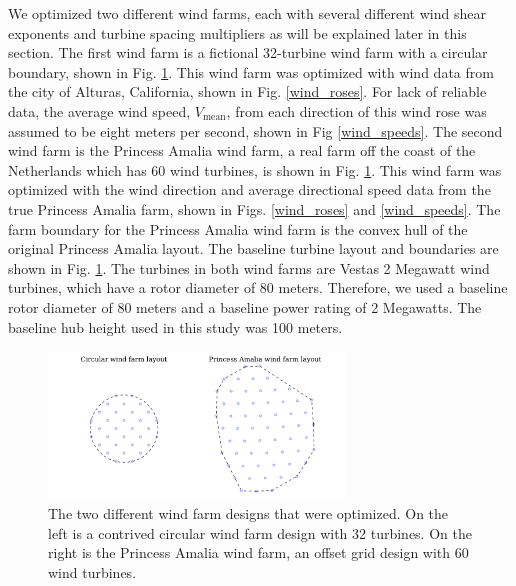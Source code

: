We optimized two different wind farms, each with several different wind shear exponents and turbine spacing multipliers as will be explained later in this section. 
The first wind farm is a fictional 32-turbine wind farm with a circular boundary, shown in Fig. \ref{layouts}. %
This wind farm was optimized with wind data from the city of Alturas, California, shown in Fig. \ref{wind_roses}. For lack of reliable data, the average wind speed, $V_{\text{mean}}$, from each direction of this wind rose was assumed to be eight meters per second, shown in Fig \ref{wind_speeds}.
The second wind farm is the Princess Amalia wind farm, a real farm off the coast of the Netherlands which has 60 wind turbines, is shown in Fig. \ref{layouts}. This wind farm was optimized with the wind direction and average directional speed data from the true Princess Amalia farm, shown in Figs. \ref{wind_roses} and \ref{wind_speeds}. The farm boundary for the Princess Amalia wind farm is the convex hull of the original Princess Amalia layout. The baseline turbine layout and boundaries are shown in Fig. \ref{layouts}. The turbines in both wind farms are Vestas 2 Megawatt wind turbines, which have a rotor diameter of 80 meters. Therefore, we used a baseline rotor diameter of 80 meters and a baseline power rating of 2 Megawatts. The baseline hub height used in this study was 100 meters. 

\begin{figure}[htbp]
  \centering
   \includegraphics[width=0.7\textwidth]{Figures/baseline_layouts.pdf}
  \caption{\label{layouts} The two different wind farm designs that were optimized. On the left is a contrived circular wind farm design with 32 turbines. On the right is the Princess Amalia wind farm, an offset grid design with 60 wind turbines. }
\end{figure}


